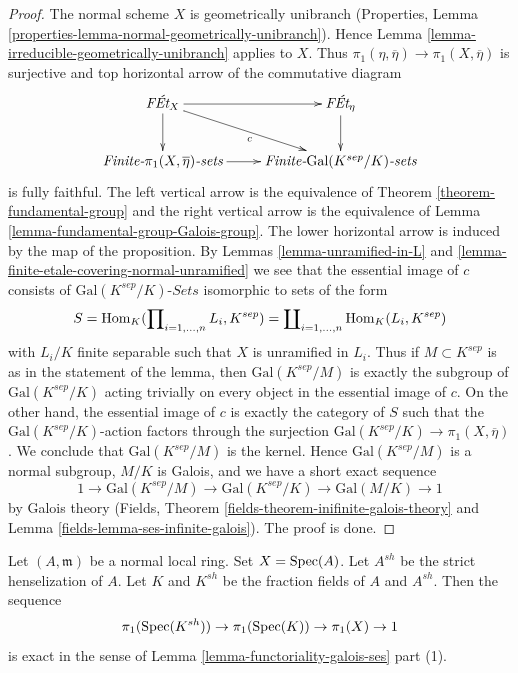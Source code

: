 \begin{proof}
The normal scheme $X$ is geometrically unibranch
(Properties, Lemma \ref{properties-lemma-normal-geometrically-unibranch}).
Hence Lemma \ref{lemma-irreducible-geometrically-unibranch} applies to $X$.
Thus $\pi_1(\eta, \overline{\eta}) \to \pi_1(X, \overline{\eta})$
is surjective and top horizontal arrow of the commutative diagram
$$
\xymatrix{
\textit{F\'Et}_X \ar[r] \ar[d] \ar[rd]_c & \textit{F\'Et}_\eta \ar[d] \\
\textit{Finite-}\pi_1(X, \overline{\eta})\textit{-sets} \ar[r] &
\textit{Finite-}\text{Gal}(K^{sep}/K)\textit{-sets}
}
$$
is fully faithful. The left vertical arrow is the equivalence of
Theorem \ref{theorem-fundamental-group}
and the right vertical arrow is the equivalence of
Lemma \ref{lemma-fundamental-group-Galois-group}. The lower
horizontal arrow is induced by the map of the proposition.
By Lemmas \ref{lemma-unramified-in-L} and
\ref{lemma-finite-etale-covering-normal-unramified}
we see that the essential image of $c$
consists of $\text{Gal}(K^{sep}/K)\textit{-Sets}$ isomorphic
to sets of the form
$$
S = \mathop{\mathrm{Hom}}\nolimits_K(\prod\nolimits_{i = 1, \ldots, n} L_i, K^{sep}) =
\coprod\nolimits_{i = 1, \ldots, n} \mathop{\mathrm{Hom}}\nolimits_K(L_i, K^{sep})
$$
with $L_i/K$ finite separable such that $X$ is unramified in $L_i$.
Thus if $M \subset K^{sep}$ is as in the statement of the lemma,
then $\text{Gal}(K^{sep}/M)$ is exactly the subgroup of
$\text{Gal}(K^{sep}/K)$ acting trivially on every object
in the essential image of $c$. On the other hand, the essential image of $c$
is exactly the category of $S$ such that the $\text{Gal}(K^{sep}/K)$-action
factors through the surjection
$\text{Gal}(K^{sep}/K) \to \pi_1(X, \overline{\eta})$.
We conclude that $\text{Gal}(K^{sep}/M)$ is the kernel.
Hence $\text{Gal}(K^{sep}/M)$ is a normal subgroup, $M/K$ is Galois,
and we have a short exact sequence
$$
1 \to \text{Gal}(K^{sep}/M) \to
\text{Gal}(K^{sep}/K) \to
\text{Gal}(M/K) \to 1
$$
by Galois theory (Fields, Theorem
\ref{fields-theorem-inifinite-galois-theory} and
Lemma \ref{fields-lemma-ses-infinite-galois}). The proof is done.
\end{proof}

\begin{lemma}
\label{lemma-local-exact-sequence-normal}
Let $(A, \mathfrak m)$ be a normal local ring.
Set $X = \mathop{\mathrm{Spec}}(A)$. Let $A^{sh}$ be the strict henselization of $A$.
Let $K$ and $K^{sh}$ be the fraction fields of $A$ and $A^{sh}$.
Then the sequence
$$
\pi_1(\mathop{\mathrm{Spec}}(K^{sh})) \to \pi_1(\mathop{\mathrm{Spec}}(K)) \to \pi_1(X) \to 1
$$
is exact in the sense of Lemma \ref{lemma-functoriality-galois-ses} part (1).
\end{lemma}

